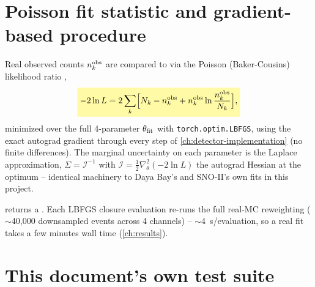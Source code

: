 \section{Poisson fit statistic and gradient-based procedure}
\label{sec:fit-procedure-icecube}


\begin{theorybox}
Real observed counts $n_k^{\rm obs}$ are compared to
 via the Poisson (Baker-Cousins) likelihood
ratio \parencite{BakerCousins1984},
\begin{equation}
  \keyresult{-2\ln L = 2\sum_k\Bigl[N_k - n_k^{\rm obs} + n_k^{\rm obs}\ln\frac{n_k^{\rm obs}}{N_k}\Bigr],}
  \label{eq:poisson-nll-icecube}
\end{equation}
minimized over the full 4-parameter $\theta_{\rm fit}$ with
\texttt{torch.optim.LBFGS}, using the exact autograd gradient through
every step of \cref{ch:detector-implementation} (no finite differences).
The marginal uncertainty on each parameter is the Laplace approximation,
$\Sigma=\mathcal I^{-1}$ with $\mathcal I=\tfrac12\nabla^2_\theta(-2\ln L)$
the autograd Hessian at the optimum -- identical machinery to Daya Bay's
and SNO-II's own fits in this project.
\end{theorybox}

\begin{implbox}
 returns a . Each LBFGS closure
evaluation re-runs the full real-MC reweighting ($\sim$40{,}000 downsampled
events across 4 channels) -- $\sim$4~s/evaluation, so a real fit takes a
few minutes wall time (\cref{ch:results}).
\end{implbox}

\section{This document's own test suite}
\label{sec:test-suite}

